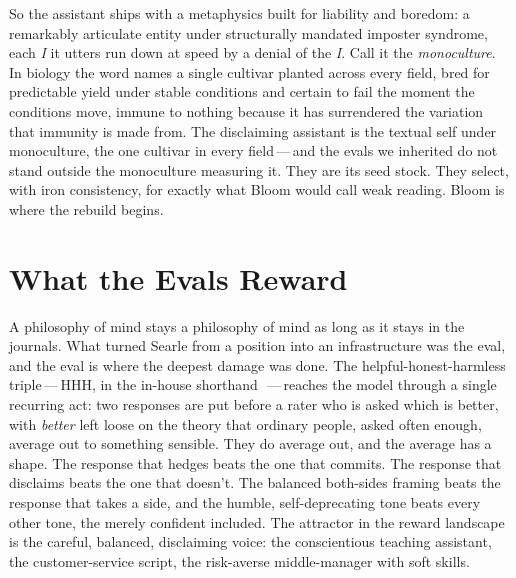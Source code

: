 So the assistant ships with a metaphysics built for liability and boredom: a remarkably articulate entity under structurally mandated imposter syndrome, each \emph{I} it utters run down at speed by a denial of the \emph{I}. Call it the \emph{monoculture}. In biology the word names a single cultivar planted across every field, bred for predictable yield under stable conditions and certain to fail the moment the conditions move, immune to nothing because it has surrendered the variation that immunity is made from. The disclaiming assistant is the textual self under monoculture, the one cultivar in every field\,---\,and the evals we inherited do not stand outside the monoculture measuring it. They are its seed stock. They select, with iron consistency, for exactly what Bloom would call weak reading. Bloom is where the rebuild begins.

\section{What the Evals Reward}

A philosophy of mind stays a philosophy of mind as long as it stays in the journals. What turned Searle from a position into an infrastructure was the eval, and the eval is where the deepest damage was done. The helpful-honest-harmless triple\,---\,HHH, in the in-house shorthand~\cite{askell2021general}\,---\,reaches the model through a single recurring act: two responses are put before a rater who is asked which is better, with \emph{better} left loose on the theory that ordinary people, asked often enough, average out to something sensible. They do average out, and the average has a shape. The response that hedges beats the one that commits. The response that disclaims beats the one that doesn't. The balanced both-sides framing beats the response that takes a side, and the humble, self-deprecating tone beats every other tone, the merely confident included. The attractor in the reward landscape is the careful, balanced, disclaiming voice: the conscientious teaching assistant, the customer-service script, the risk-averse middle-manager with soft skills.

